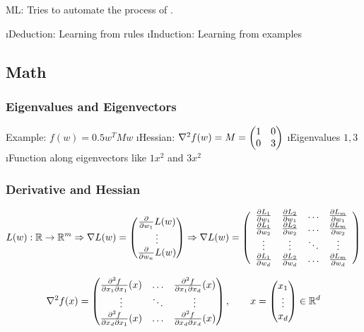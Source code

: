 
ML: Tries to automate the process of .

\be
\i Deduction: Learning from rules
\i Induction: Learning from examples
\ee

\subsection{Math}


\subsubsection{Eigenvalues and Eigenvectors}

Example: $f(w) = 0.5 w^TMw$
\bi
\i Hessian: $\nabla^2 f(w) = M = \begin{pmatrix} 1 & 0 \\ 0 & 3 \end{pmatrix}$
\i Eigenvalues $1,3$
\i Function along eigenvectors like $1x^2$ and $3x^2$
\ei

\subsubsection{Derivative and Hessian}

\newcommand{\dlw}[2]{\frac{\partial L_#1}{\partial w_#2}}
\begin{align*}
L(w): \RS \to \RS^m
\Rightarrow  \nabla L(w) = \vct{\drv{w_1}L(w)\\\vdots\\\drv{w_n}L(w)}
\Rightarrow \nabla L(w) = \left(\begin{array}{cccc}
\dlw{1}{1} & \dlw{2}{1} & \ldots & \dlw{m}{1} \\
\dlw{1}{2} & \dlw{2}{2} & \ldots & \dlw{m}{2} \\
\vdots & \vdots & \ddots & \vdots \\
\dlw{1}{d} & \dlw{2}{d} & \ldots & \dlw{m}{d}
\end{array}\right)
\end{align*}

\newcommand{\dfdx}[2]{
    \frac{\partial^2 f}{\partial x_{#1} \partial x_{#2}} (x)
}
\begin{align*}
\nabla^2 f(x) =
\vct{
    \dfdx{1}{1} & \ldots & \dfdx{1}{d} \\
    \vdots & \ddots & \vdots \\
    \dfdx{d}{1} & \ldots & \dfdx{d}{d} 
}, \qquad x = \vct{x_1\\\vdots\\x_d} \in \RS^d
\end{align*}

